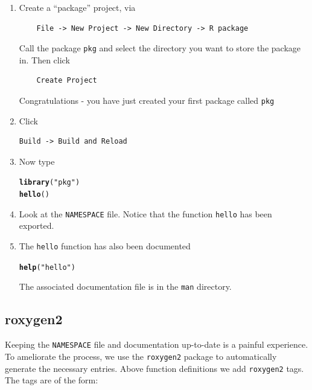 \documentclass[a4paper,justified,openany]{tufte-handout}\usepackage[]{graphicx}\usepackage[]{color}
\makeatletter
\newcommand{\hlstr}[1]{\textcolor[rgb]{0.192,0.494,0.8}{#1}}%
\newcommand{\hlstd}[1]{\textcolor[rgb]{0.345,0.345,0.345}{#1}}%
\newcommand{\hlkwd}[1]{\textcolor[rgb]{0.737,0.353,0.396}{\textbf{#1}}}%
\newenvironment{kframe}{%
 \def\at@end@of@kframe{}%
 \ifinner\ifhmode%
  \def\at@end@of@kframe{\end{minipage}}%
  \begin{minipage}{\columnwidth}%
 \fi\fi%
 \def\FrameCommand##1{\hskip\@totalleftmargin \hskip-\fboxsep
 \colorbox{shadecolor}{##1}\hskip-\fboxsep
     \hskip-\linewidth \hskip-\@totalleftmargin \hskip\columnwidth}%
 \MakeFramed {\advance\hsize-\width
   \@totalleftmargin\z@ \linewidth\hsize
   \@setminipage}}%
 {\par\unskip\endMakeFramed%
 \at@end@of@kframe}
\newenvironment{knitrout}{}{} %
\newcommand{\cc}{\texttt}
\makeatother
\begin{document}
\begin{enumerate}
\item Create  a ``package'' project, via
\begin{verbatim}
    File -> New Project -> New Directory -> R package
\end{verbatim}
Call the package \cc{pkg} and select the directory you want to store the package
in. Then click
\begin{verbatim}
    Create Project
\end{verbatim}
Congratulations - you have just created your first package called \cc{pkg}
\item Click
\begin{verbatim}
Build -> Build and Reload
\end{verbatim}
\item Now type
\begin{knitrout}
\color{fgcolor}\begin{kframe}
\begin{alltt}
\hlkwd{library}\hlstd{(}\hlstr{"pkg"}\hlstd{)}
\hlkwd{hello}\hlstd{()}
\end{alltt}
\end{kframe}
\end{knitrout}
\item Look at the \cc{NAMESPACE} file. Notice that the function \cc{hello}
  has been exported.
\item The \cc{hello} function has also been documented
\begin{knitrout}
\color{fgcolor}\begin{kframe}
\begin{alltt}
\hlkwd{help}\hlstd{(}\hlstr{"hello"}\hlstd{)}
\end{alltt}
\end{kframe}
\end{knitrout}
The associated documentation file is in the \cc{man} directory.
\end{enumerate}

\subsection{roxygen2}

Keeping the \cc{NAMESPACE} file and documentation up-to-date is a painful
experience. To ameliorate the process, we use the \cc{roxygen2} package to
automatically generate the necessary entries. Above function definitions we add
\cc{roxygen2} tags. The tags are of the form:
\end{document}
